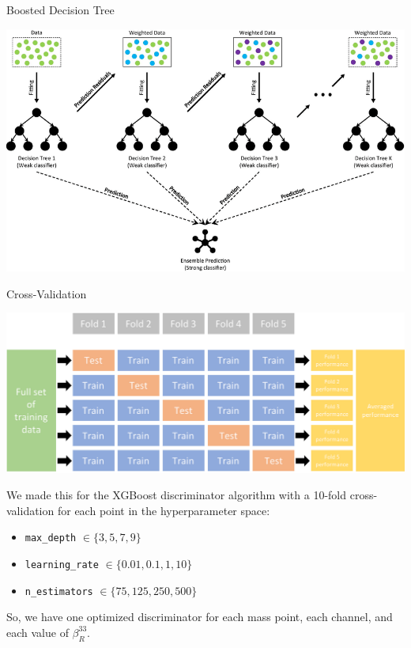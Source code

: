 \documentclass{../bredelebeamer}
\begin{document}
\begin{frame}{Boosted Decision Tree}
	\begin{center}
		\includegraphics[width=1.0\linewidth]{BDT.png}
	\end{center}
\end{frame}


\begin{frame}{Cross-Validation}
	\begin{center}
		\includegraphics[width=1.0\linewidth]{CV.png}
	\end{center}

	We made this for the XGBoost discriminator algorithm with a 10-fold cross-validation for each point in the hyperparameter space:
	\begin{itemize}
		\item \texttt{max\_depth} $\in \{3, 5, 7, 9\}$
		\item \texttt{learning\_rate} $\in \{ 0.01, 0.1, 1, 10\}$
		\item \texttt{n\_estimators} $\in \{75, 125, 250, 500\}$
	\end{itemize}
	So, we have one optimized discriminator for each mass point, each channel, and each value of $\beta_R^{33}$.

\end{frame}
\end{document}
